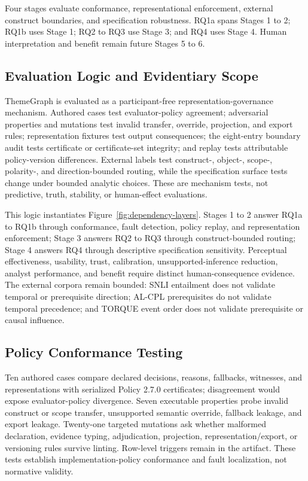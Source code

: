 \documentclass[manuscript,screen,review]{acmart}
\begin{document}
Four stages evaluate conformance, representational enforcement, external construct boundaries, and specification robustness. RQ1a spans Stages 1 to 2; RQ1b uses Stage 1; RQ2 to RQ3 use Stage 3; and RQ4 uses Stage 4. Human interpretation and benefit remain future Stages 5 to 6.

\subsection{Evaluation Logic and Evidentiary Scope}

ThemeGraph is evaluated as a participant-free representation-governance mechanism. Authored cases test evaluator-policy agreement; adversarial properties and mutations test invalid transfer, override, projection, and export rules; representation fixtures test output consequences; the eight-entry boundary audit tests certificate or certificate-set integrity; and replay tests attributable policy-version differences. External labels test construct-, object-, scope-, polarity-, and direction-bounded routing, while the specification surface tests change under bounded analytic choices. These are mechanism tests, not predictive, truth, stability, or human-effect evaluations.

This logic instantiates Figure~\ref{fig:dependency-layers}. Stages 1 to 2 answer RQ1a to RQ1b through conformance, fault detection, policy replay, and representation enforcement; Stage 3 answers RQ2 to RQ3 through construct-bounded routing; Stage 4 answers RQ4 through descriptive specification sensitivity. Perceptual effectiveness, usability, trust, calibration, unsupported-inference reduction, analyst performance, and benefit require distinct human-consequence evidence. The external corpora remain bounded: SNLI entailment does not validate temporal or prerequisite direction; AL-CPL prerequisites do not validate temporal precedence; and TORQUE event order does not validate prerequisite or causal influence.

\subsection{Policy Conformance Testing}

Ten authored cases compare declared decisions, reasons, fallbacks, witnesses, and representations with serialized Policy 2.7.0 certificates; disagreement would expose evaluator-policy divergence. Seven executable properties probe invalid construct or scope transfer, unsupported semantic override, fallback leakage, and export leakage. Twenty-one targeted mutations ask whether malformed declaration, evidence typing, adjudication, projection, representation/export, or versioning rules survive linting. Row-level triggers remain in the artifact. These tests establish implementation-policy conformance and fault localization, not normative validity.
\end{document}

